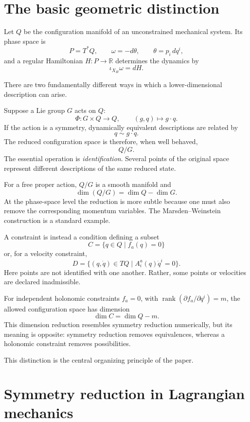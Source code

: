 \section{The basic geometric distinction}

Let $Q$ be the configuration manifold of an unconstrained mechanical system.
Its phase space is
\[
        P=T^*Q,
        \qquad
        \omega=-d\theta,
        \qquad
        \theta=p_i\,d q^i,
\]
and a regular Hamiltonian $H:P\to\mathbb{R}$ determines the dynamics by
\[
        \iota_{X_H}\omega=d H.
\]

There are two fundamentally different ways in which a lower-dimensional
description can arise.

Suppose a Lie group $G$ acts on $Q$:
\[
        \Phi:G\times Q\longrightarrow Q,
        \qquad
        (g,q)\mapsto g\cdot q.
\]
If the action is a symmetry, dynamically equivalent descriptions are related
by
\[
        q\sim g\cdot q.
\]
The reduced configuration space is therefore, when well behaved,
\[
        Q/G.
\]
The essential operation is \emph{identification}.  Several points of the
original space represent different descriptions of the same reduced state.

For a free proper action, $Q/G$ is a smooth manifold and
\[
        \dim(Q/G)=\dim Q-\dim G.
\]
At the phase-space level the reduction is more subtle because one must also
remove the corresponding momentum variables.  The Marsden--Weinstein
construction is a standard example.

A constraint is instead a condition defining a subset
\[
        C=\{q\in Q\mid f_a(q)=0\}
\]
or, for a velocity constraint,
\[
        D=\{(q,\dot q)\in TQ\mid A^a_i(q)\dot q^i=0\}.
\]
Here points are not identified with one another.  Rather, some points or
velocities are declared inadmissible.

For independent holonomic constraints $f_a=0$, with
$\operatorname{rank}(\partial f_a/\partial q^i)=m$, the allowed configuration space has
dimension
\[
        \dim C=\dim Q-m.
\]
This dimension reduction resembles symmetry reduction numerically, but its
meaning is opposite: symmetry reduction removes equivalences, whereas a
holonomic constraint removes possibilities.

This distinction is the central organizing principle of the paper.

\section{Symmetry reduction in Lagrangian mechanics}

